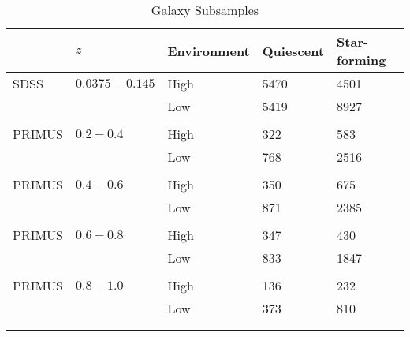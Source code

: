 \documentclass{emulateapj}
\begin{document}
\begin{table} %
  \caption{Galaxy Subsamples}
  \label{tab:subsample}
  \begin{center}
    \leavevmode
    \begin{tabular}{lllll} \hline \hline              
      &$z$ &Environment        &Quiescent  &Star-forming  \\ \hline 
  SDSS      &$0.0375-0.145$ &High           &5470                       &4501                           \\
            &               &Low            &5419                       &8927                           \\
            &               &               &                       &                           \\ \hline
  PRIMUS    &$0.2-0.4$      &High           &322                    &583                           \\
            &               &Low            &768                    &2516                           \\
            &               &               &                       &                           \\ \hline
  PRIMUS    &$0.4-0.6$      &High           &350                       &675                           \\
            &               &Low            &871                       &2385                           \\
            &               &               &                       &                           \\ \hline
  PRIMUS    &$0.6-0.8$      &High           &347                       &430                           \\
            &               &Low            &833                       &1847                           \\
            &               &               &                       &                           \\ \hline
  PRIMUS    &$0.8-1.0$      &High           &136                       &232                           \\
            &               &Low            &373                       &810                           \\
            &               &               &                       &                           \\ \hline
  \multicolumn{5}{l}{}                                             \\       
    \end{tabular} 
  \end{center}
\end{table}
\end{document}
